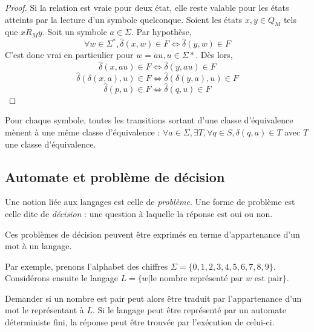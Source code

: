 	 \begin{proof}
	 	Si la relation est vraie pour deux état, elle reste valable pour les états atteints par la lecture d'un symbole quelconque. Soient les états $x,y \in Q_M$ tels que $xR_My$. Soit un symbole $a \in \Sigma$. Par hypothèse, 
	 	$$\forall w \in \Sigma^*, \hat{\delta}(x, w) \in F \iff \hat{\delta}(y, w) \in F$$
	 	C'est donc vrai en particulier pour $w = au, u \in \Sigma*$. Dès lors,
	 	$$\hat{\delta}(x, au) \in F\iff \hat{\delta}(y, au)\in F$$
	 	$$\hat{\delta}(\delta(x,a),u) \in F\iff\hat{\delta}(\delta(y,a),u)\in F$$
	 	$$\hat{\delta}(p,u) \in F\iff \hat{\delta}(q,u)\in F$$
	 \end{proof}
 
 	\begin{corollary}
 		Pour chaque symbole, toutes les transitions sortant d'une classe d'équivalence mènent à une même classe d'équivalence :
 		$\forall a \in \Sigma, \exists T, \forall q \in S, \delta(q,a)\in T$ avec $T$ une classe d'équivalence.
 	\end{corollary}
	 
	 
	 \subsection{Automate et problème de décision}
	 
	 Une notion liée aux langages est celle de \emph{problème}. Une forme de problème est celle dite de \emph{décision} : une question à laquelle la réponse est oui ou non.
	 
	 Ces problèmes de décision peuvent être exprimés en terme d'appartenance d'un mot à un langage.
	 
	 Par exemple, prenons l'alphabet des chiffres $\Sigma=\{0,1,2,3,4,5,6,7,8,9\}$. Considérons ensuite le langage $L = \{w | \text{le nombre représenté par } w \text{ est pair}\}$.
	 
	 Demander si un nombre est pair peut alors être traduit par l'appartenance d'un mot le représentant à $L$. Si le langage peut être représenté par un automate déterministe fini, la réponse peut être trouvée par l'exécution de celui-ci.
	 
	 
	 
	 